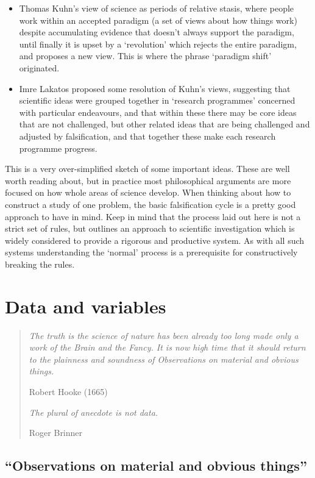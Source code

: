 \documentclass[
]{book}
\begin{document}
\begin{itemize}
\item
  Thomas Kuhn's view of science as periods of relative stasis, where people work within an accepted paradigm (a set of views about how things work) despite accumulating evidence that doesn't always support the paradigm, until finally it is upset by a `revolution' which rejects the entire paradigm, and proposes a new view. This is where the phrase `paradigm shift' originated.
\item
  Imre Lakatos proposed some resolution of Kuhn's views, suggesting that scientific ideas were grouped together in `research programmes' concerned with particular endeavours, and that within these there may be core ideas that are not challenged, but other related ideas that are being challenged and adjusted by falsification, and that together these make each research programme progress.
\end{itemize}

This is a very over-simplified sketch of some important ideas. These are well worth reading about, but in practice most philosophical arguments are more focused on how whole areas of science develop. When thinking about how to construct a study of one problem, the basic falsification cycle is a pretty good approach to have in mind. Keep in mind that the process laid out here is not a strict set of rules, but outlines an approach to scientific investigation which is widely considered to provide a rigorous and productive system. As with all such systems understanding the `normal' process is a prerequisite for constructively breaking the rules.

\hypertarget{data-variables}{%
\chapter{Data and variables}\label{data-variables}}

\begin{quote}
\emph{The truth is the science of nature has been already too long made only a work of the Brain and the Fancy. It is now high time that it should return to the plainness and soundness of Observations on material and obvious things.}

Robert Hooke (1665)

\emph{The plural of anecdote is not data.}

Roger Brinner
\end{quote}

\hypertarget{observations-on-material-and-obvious-things}{%
\section{``Observations on material and obvious things''}\label{observations-on-material-and-obvious-things}}
\end{document}
